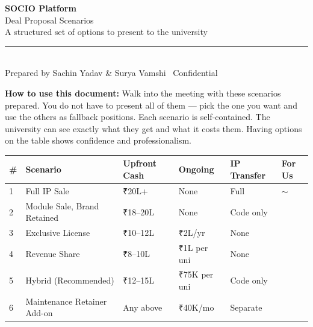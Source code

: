 \documentclass[12pt,a4paper]{article}
\newcommand{\good}{\textcolor{green}{\textbf{\checkmark}}}
\newcommand{\neutral}{\textcolor{amber}{\textbf{$\sim$}}}
\begin{document}
    \begin{center}
        {\fontsize{26}{34}\selectfont\bfseries\color{primary} SOCIO Platform}\\[0.3cm]
        {\Large\color{accent} Deal Proposal Scenarios}\\[0.2cm]
        {\normalsize\color{darkgray} A structured set of options to present to the university}\\[0.4cm]
        \noindent\rule{\textwidth}{1pt}\\[0.2cm]
        {\small\color{darkgray} Prepared by Sachin Yadav \& Surya Vamshi \textbullet\ Confidential \textbullet\ \the\year}
    \end{center}

    \vspace{0.5cm}

    \begin{infobox}
    \textbf{How to use this document:} Walk into the meeting with these scenarios prepared. You do not have to present all of them — pick the one you want and use the others as fallback positions. Each scenario is self-contained. The university can see exactly what they get and what it costs them. Having options on the table shows confidence and professionalism.
    \end{infobox}

    \vspace{0.5cm}

    \begin{tabularx}{\textwidth}{C{0.6cm} L{3.8cm} C{2.2cm} C{2.2cm} C{2.2cm} C{1.6cm}}
    \toprule
    \textbf{\#} & \textbf{Scenario} & \textbf{Upfront Cash} & \textbf{Ongoing} & \textbf{IP Transfer} & \textbf{For Us} \\
     & Full IP Sale & ₹20L+ & None & Full & \neutral \\
    2 & Module Sale, Brand Retained & ₹18–20L & None & Code only & \good \\
    3 & Exclusive License & ₹10–12L & ₹2L/yr & None & \good \\
    4 & Revenue Share & ₹8–10L & ₹1L per uni & None & \good \\
    5 & Hybrid (Recommended) & ₹12–15L & ₹75K per uni & Code only & \good \\
    6 & Maintenance Retainer Add-on & Any above & ₹40K/mo & Separate & \good \\
    \bottomrule
    \end{tabularx}
\end{document}
